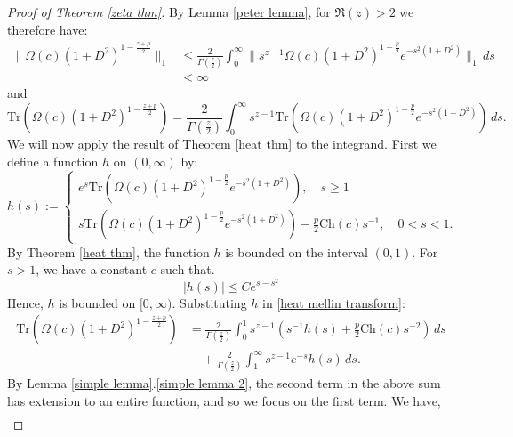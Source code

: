\begin{proof}[Proof of Theorem \ref{zeta thm}]
        By Lemma \ref{peter lemma}, for $\Re(z) > 2$ we therefore have:
        \begin{align*}
            \|\Omega(c)(1+D^2)^{1-\frac{z+p}{2}}\|_1 &\leq \frac{2}{\Gamma\left(\frac{z}{2}\right)}\int_0^\infty \|s^{z-1}\Omega(c)(1+D^2)^{1-\frac{p}{2}}e^{-s^2(1+D^2)}\|_1\,ds\\
                                                     &< \infty
        \end{align*}
        and
        \begin{equation}\label{heat mellin transform}
            \mathrm{Tr}(\Omega(c)(1+D^2)^{1-\frac{z+p}{2}}) = \frac{2}{\Gamma\left(\frac{z}{2}\right)}\int_0^\infty s^{z-1}\mathrm{Tr}(\Omega(c)(1+D^2)^{1-\frac{p}{2}}e^{-s^2(1+D^2)})\,ds.
        \end{equation}        
        We will now apply the result of Theorem \ref{heat thm} to the integrand. First we define a function $h$ on $(0,\infty)$ by:
        \begin{equation*}
            h(s) := \begin{cases}
                        e^s\mathrm{Tr}(\Omega(c)(1+D^2)^{1-\frac{p}{2}}e^{-s^2(1+D^2)}), \quad s \geq 1\\
                        s\mathrm{Tr}(\Omega(c)(1+D^2)^{1-\frac{p}{2}}e^{-s^2(1+D^2)})-\frac{p}{2}\mathrm{Ch}(c)s^{-1}, \quad 0 < s < 1.
                    \end{cases}
        \end{equation*}
        By Theorem \ref{heat thm}, the function $h$ is bounded on the interval $(0,1).$ For $s > 1$, we have a constant $c$ such that.
        \begin{equation*}
            |h(s)| \leq Ce^{s-s^2}
        \end{equation*}
        Hence, $h$ is bounded on $[0,\infty)$. Substituting $h$ in \eqref{heat mellin transform}:
        \begin{align*}
            \mathrm{Tr}(\Omega(c)(1+D^2)^{1-\frac{z+p}{2}}) &= \frac{2}{\Gamma\left(\frac{z}{2}\right)}\int_0^1 s^{z-1}(s^{-1}h(s)+\frac{p}{2}\mathrm{Ch}(c)s^{-2})\,ds\\
                                                    &\quad +\frac{2}{\Gamma\left(\frac{z}{2}\right)}\int_1^\infty s^{z-1}e^{-s}h(s)\,ds.
        \end{align*}
        By Lemma \ref{simple lemma}.\eqref{simple lemma 2}, the second term in the above sum has extension to an entire function, and so we focus on the first term.
        We have,
        \begin{align*}

\end{align*}
\end{proof}
